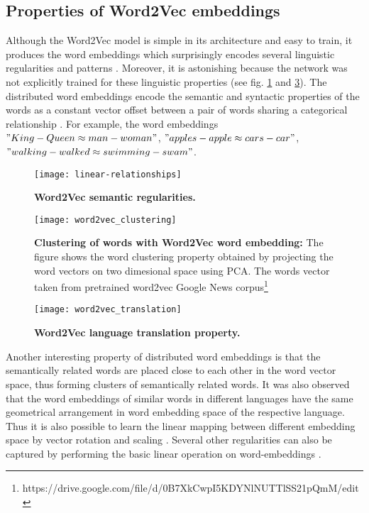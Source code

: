 \subsection{Properties of Word2Vec embeddings}

Although the Word2Vec model is simple in its architecture and easy to train, it produces the word embeddings which surprisingly encodes several linguistic regularities and patterns \cite{w2v:language_similarities, w2v:mikolov_2013_distributed}. Moreover, it is astonishing because the network was not explicitly trained for these linguistic properties (see fig. \ref{fig:sem_rel} and \ref{fig:w2v_translation}). The distributed word embeddings encode the semantic and syntactic properties of the words as a constant vector offset between a pair of words sharing a categorical relationship \cite{w2v:mikolov_2013_distributed}. For example, the word embeddings $"King - Queen \approx man - woman"$, $"apples - apple \approx cars - car"$, $"walking - walked \approx swimming - swam"$.

\begin{figure}[hbtp]
\centering
\texttt{[image: linear-relationships]}
\caption[Semantic regularities in Word2Vec word embeddings]{\textbf{Word2Vec semantic regularities.}} 
\label{fig:sem_rel}
\end{figure}

\begin{figure}[hbtp]
\centering
\texttt{[image: word2vec\_clustering]}
\caption [Clustering of words with Word2Vec word embeddings.]{\textbf{Clustering of words with Word2Vec word embedding:} {\small The figure shows the word clustering property obtained by projecting the word vectors on two dimesional space using PCA. The words vector taken from pretrained word2vec Google News corpus\footnote{https://drive.google.com/file/d/0B7XkCwpI5KDYNlNUTTlSS21pQmM/edit}} }
\label{fig:w2v_clustering}
\end{figure}

\begin{figure}[hbtp]
\centering
\texttt{[image: word2vec\_translation]}
\caption[Word2Vec language translation property]{\textbf{Word2Vec language translation property.}}
\label{fig:w2v_translation}
\end{figure}

Another interesting property of distributed word embeddings is that the semantically related words are placed close to each other in the word vector space, thus forming clusters of semantically related words. It was also observed that the word embeddings of similar words in different languages have the same geometrical arrangement in word embedding space of the respective language. Thus it is also possible to learn the linear mapping between different embedding space by vector rotation and scaling \cite{w2v:language_similarities}. Several other regularities can also be captured by performing the basic linear operation on word-embeddings \cite{w2v:mikolov_2013_distributed}. 

